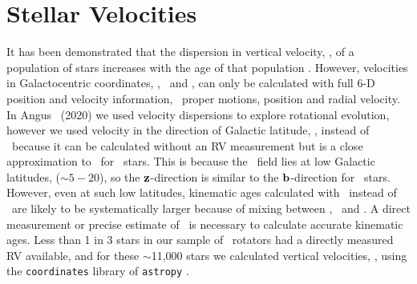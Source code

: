\section{Stellar Velocities}
\label{sec:velocities}

It has been demonstrated that the dispersion in vertical velocity, \vz, of a
population of stars increases with the age of that population
\citep[\eg][]{stromberg1946, wielen1977, nordstrom2004, holmberg2007,
holmberg2009, aumer2009, casagrande2011, ting2019, yu2018}.
However, velocities in Galactocentric coordinates, \vx, \vy\ and \vz, can only
be calculated with full 6-D position and velocity information, \ie\ proper
motions, position and radial velocity.
In Angus \etal\ (2020) we used velocity dispersions to explore rotational
evolution, however we used velocity in the direction of Galactic latitude,
\vb, instead of \vz\ because it can be calculated without an RV measurement
but is a close approximation to \vz\ for \kepler\ stars.
This is because the \kepler\ field lies at low Galactic latitudes, ($\sim
5-20$\degrees), so the ${\bf z}$-direction is similar to the ${\bf
b}$-direction for \kepler\ stars.
However, even at such low latitudes, kinematic ages calculated with \vb\
instead of \vz\ are likely to be systematically larger because of mixing
between \vz, \vx\ and \vy.
A direct measurement or precise estimate of \vz\ is necessary to calculate
accurate kinematic ages.
Less than 1 in 3 stars in our sample of \kepler\ rotators had a directly
measured RV available, and for these $\sim$11,000 stars we calculated vertical
velocities, \vz, using the {\tt coordinates} library of {\tt astropy}
\citep{astropy2013, astropy2018}.


